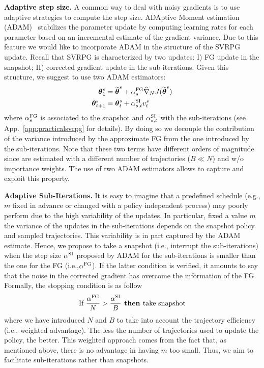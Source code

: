 \documentclass{article}
\makeatletter
\theoremstyle{remark}
\theoremstyle{definition}
\DeclareRobustCommand{\eg}{e.g.,\@\xspace}
\DeclareRobustCommand{\ie}{i.e.,\@\xspace}
\newcommand{\vtheta}{\boldsymbol{\theta}}
\newcommand{\wt}[1]{\widetilde{#1}}
\newcommand{\wh}[1]{\widehat{#1}}
\makeatother
\begin{document}
\textbf{Adaptive step size.}
A common way to deal with noisy gradients is to use adaptive strategies to compute the step size.
ADAptive Moment estimation (ADAM)~\citep{kingma2014adam} stabilizes the parameter update by computing learning rates for each parameter based on an incremental estimate of the gradient variance.
Due to this feature we would like to incorporate ADAM in the structure of the SVRPG update.
Recall that SVRPG is characterized by two updates: I) FG update in the snapshot; II) corrected gradient update in the sub-iterations.
Given this structure, we suggest to use two ADAM estimators:
\begin{align*}
        \vtheta^{s}_1 &= \wt{\vtheta}^s + \alpha^{\textsc{FG}}_s\wh{\nabla}_N J(\wt{\vtheta}^s)\\
        \vtheta^{s}_{t+1} &= \vtheta^{s}_t + \alpha^{\textsc{SI}}_{s,t} v_t^{s}
\end{align*}
where $\alpha^{\textsc{FG}}_{s}$ is associated to the snapshot and $\alpha^{\textsc{SI}}_{s,t}$ with the sub-iterations (see App.~\ref{app:practicalsvrpg} for details).
By doing so we decouple the contribution of the variance introduced by the approximate FG from the one introduced by the sub-iterations.
Note that these two terms have different orders of magnitude since are estimated with a different number of trajectories ($B \ll N$) and w/o importance weights.
The use of two ADAM estimators allows to capture and exploit this property.

\textbf{Adaptive Sub-Iterations.}
It is easy to imagine that a predefined schedule (\eg $m$ fixed in advance or changed with a policy independent process) may poorly perform due to the high variability of the updates.
In particular, fixed a value $m$ the variance of the updates in the sub-iterations depends on the snapshot policy and sampled trajectories.
This variability is in part captured by the ADAM estimate. Hence, we propose to take a snapshot (\ie interrupt the sub-iterations) when the step size $\alpha^{\textsc{SI}}$ proposed by ADAM for the sub-iterations is smaller than the one for the FG (\ie $\alpha^{\textsc{FG}}$).
If the latter condition is verified, it amounts to say that the noise in the corrected gradient has overcome the information of the FG.
Formally, the stopping condition is as follow
\[
        \text{If }        \frac{\alpha^{\textsc{FG}}}{N} > \frac{\alpha^{\textsc{SI}}}{B} \textbf{ then } \text{take snapshot}
\]
where we have introduced $N$ and $B$ to take into account the trajectory efficiency (\ie weighted advantage).
The less the number of trajectories used to update the policy, the better.
This weighted approach comes from the fact that, as mentioned above, there is no advantage in having $m$ too small.
Thus, we aim to facilitate sub-iterations rather than snapshots.
\end{document}
